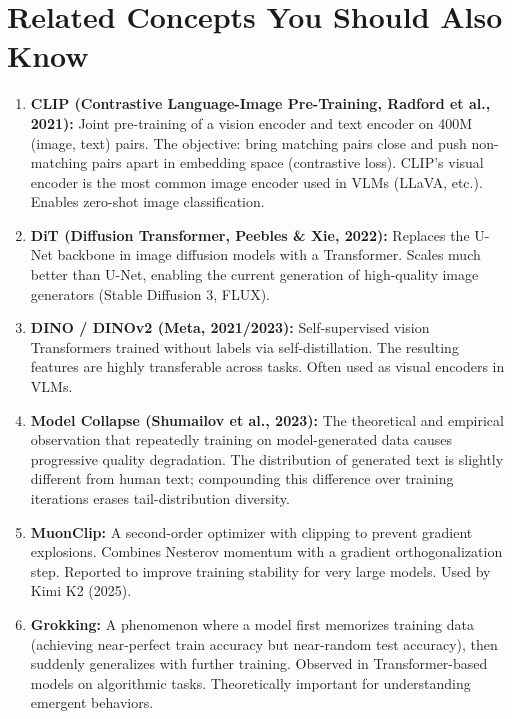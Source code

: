 \documentclass[11pt, a4paper]{article}
\begin{document}
\newpage
\section{Related Concepts You Should Also Know}

\begin{enumerate}[leftmargin=2em]
  \item \textbf{CLIP (Contrastive Language-Image Pre-Training, Radford et al., 2021):} Joint pre-training of a vision encoder and text encoder on 400M (image, text) pairs. The objective: bring matching pairs close and push non-matching pairs apart in embedding space (contrastive loss). CLIP's visual encoder is the most common image encoder used in VLMs (LLaVA, etc.). Enables zero-shot image classification.

  \item \textbf{DiT (Diffusion Transformer, Peebles \& Xie, 2022):} Replaces the U-Net backbone in image diffusion models with a Transformer. Scales much better than U-Net, enabling the current generation of high-quality image generators (Stable Diffusion 3, FLUX).

  \item \textbf{DINO / DINOv2 (Meta, 2021/2023):} Self-supervised vision Transformers trained without labels via self-distillation. The resulting features are highly transferable across tasks. Often used as visual encoders in VLMs.

  \item \textbf{Model Collapse (Shumailov et al., 2023):} The theoretical and empirical observation that repeatedly training on model-generated data causes progressive quality degradation. The distribution of generated text is slightly different from human text; compounding this difference over training iterations erases tail-distribution diversity.

  \item \textbf{MuonClip:} A second-order optimizer with clipping to prevent gradient explosions. Combines Nesterov momentum with a gradient orthogonalization step. Reported to improve training stability for very large models. Used by Kimi K2 (2025).

  \item \textbf{Grokking:} A phenomenon where a model first memorizes training data (achieving near-perfect train accuracy but near-random test accuracy), then suddenly generalizes with further training. Observed in Transformer-based models on algorithmic tasks. Theoretically important for understanding emergent behaviors.


\end{enumerate}
\end{document}
